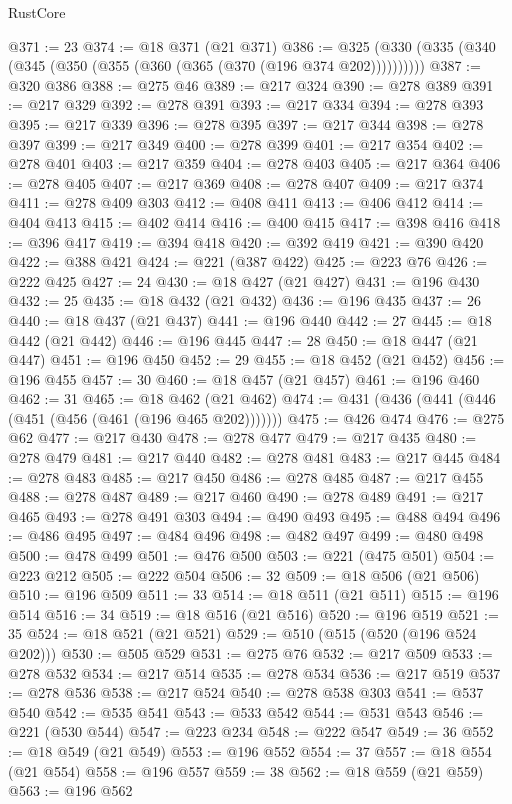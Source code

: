 \begin{lexlean}{RustCore}
\begin{coremodule}
@371 := 23
@374 := @18 @371 (@21 @371)
@386 := @325 (@330 (@335 (@340 (@345 (@350 (@355 (@360 (@365 (@370 (@196 @374 @202))))))))))
@387 := @320 @386
@388 := @275 @46
@389 := @217 @324
@390 := @278 @389
@391 := @217 @329
@392 := @278 @391
@393 := @217 @334
@394 := @278 @393
@395 := @217 @339
@396 := @278 @395
@397 := @217 @344
@398 := @278 @397
@399 := @217 @349
@400 := @278 @399
@401 := @217 @354
@402 := @278 @401
@403 := @217 @359
@404 := @278 @403
@405 := @217 @364
@406 := @278 @405
@407 := @217 @369
@408 := @278 @407
@409 := @217 @374
@411 := @278 @409 @303
@412 := @408 @411
@413 := @406 @412
@414 := @404 @413
@415 := @402 @414
@416 := @400 @415
@417 := @398 @416
@418 := @396 @417
@419 := @394 @418
@420 := @392 @419
@421 := @390 @420
@422 := @388 @421
@424 := @221 (@387 @422)
@425 := @223 @76
@426 := @222 @425
@427 := 24
@430 := @18 @427 (@21 @427)
@431 := @196 @430
@432 := 25
@435 := @18 @432 (@21 @432)
@436 := @196 @435
@437 := 26
@440 := @18 @437 (@21 @437)
@441 := @196 @440
@442 := 27
@445 := @18 @442 (@21 @442)
@446 := @196 @445
@447 := 28
@450 := @18 @447 (@21 @447)
@451 := @196 @450
@452 := 29
@455 := @18 @452 (@21 @452)
@456 := @196 @455
@457 := 30
@460 := @18 @457 (@21 @457)
@461 := @196 @460
@462 := 31
@465 := @18 @462 (@21 @462)
@474 := @431 (@436 (@441 (@446 (@451 (@456 (@461 (@196 @465 @202)))))))
@475 := @426 @474
@476 := @275 @62
@477 := @217 @430
@478 := @278 @477
@479 := @217 @435
@480 := @278 @479
@481 := @217 @440
@482 := @278 @481
@483 := @217 @445
@484 := @278 @483
@485 := @217 @450
@486 := @278 @485
@487 := @217 @455
@488 := @278 @487
@489 := @217 @460
@490 := @278 @489
@491 := @217 @465
@493 := @278 @491 @303
@494 := @490 @493
@495 := @488 @494
@496 := @486 @495
@497 := @484 @496
@498 := @482 @497
@499 := @480 @498
@500 := @478 @499
@501 := @476 @500
@503 := @221 (@475 @501)
@504 := @223 @212
@505 := @222 @504
@506 := 32
@509 := @18 @506 (@21 @506)
@510 := @196 @509
@511 := 33
@514 := @18 @511 (@21 @511)
@515 := @196 @514
@516 := 34
@519 := @18 @516 (@21 @516)
@520 := @196 @519
@521 := 35
@524 := @18 @521 (@21 @521)
@529 := @510 (@515 (@520 (@196 @524 @202)))
@530 := @505 @529
@531 := @275 @76
@532 := @217 @509
@533 := @278 @532
@534 := @217 @514
@535 := @278 @534
@536 := @217 @519
@537 := @278 @536
@538 := @217 @524
@540 := @278 @538 @303
@541 := @537 @540
@542 := @535 @541
@543 := @533 @542
@544 := @531 @543
@546 := @221 (@530 @544)
@547 := @223 @234
@548 := @222 @547
@549 := 36
@552 := @18 @549 (@21 @549)
@553 := @196 @552
@554 := 37
@557 := @18 @554 (@21 @554)
@558 := @196 @557
@559 := 38
@562 := @18 @559 (@21 @559)
@563 := @196 @562

\end{coremodule}
\end{lexlean}
